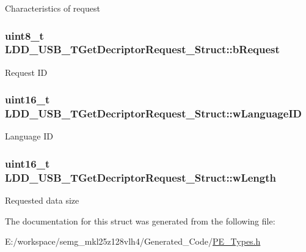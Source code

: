 Characteristics of request \hypertarget{struct_l_d_d___u_s_b___t_get_decriptor_request___struct_aa7651472aa5110086f335c0b79c0bc5b}{
\subsubsection[{b\-Request}]{\setlength{\rightskip}{0pt plus 5cm}uint8\-\_\-t L\-D\-D\-\_\-\-U\-S\-B\-\_\-\-T\-Get\-Decriptor\-Request\-\_\-\-Struct\-::b\-Request}}\label{struct_l_d_d___u_s_b___t_get_decriptor_request___struct_aa7651472aa5110086f335c0b79c0bc5b}
Request I\-D \hypertarget{struct_l_d_d___u_s_b___t_get_decriptor_request___struct_a228c41af26c45c1fa18d964c0702a4b4}{
\subsubsection[{w\-Language\-I\-D}]{\setlength{\rightskip}{0pt plus 5cm}uint16\-\_\-t L\-D\-D\-\_\-\-U\-S\-B\-\_\-\-T\-Get\-Decriptor\-Request\-\_\-\-Struct\-::w\-Language\-I\-D}}\label{struct_l_d_d___u_s_b___t_get_decriptor_request___struct_a228c41af26c45c1fa18d964c0702a4b4}
Language I\-D \hypertarget{struct_l_d_d___u_s_b___t_get_decriptor_request___struct_af9ac7409b4031aa6f3ec5da9d79b06eb}{
\subsubsection[{w\-Length}]{\setlength{\rightskip}{0pt plus 5cm}uint16\-\_\-t L\-D\-D\-\_\-\-U\-S\-B\-\_\-\-T\-Get\-Decriptor\-Request\-\_\-\-Struct\-::w\-Length}}\label{struct_l_d_d___u_s_b___t_get_decriptor_request___struct_af9ac7409b4031aa6f3ec5da9d79b06eb}
Requested data size 

The documentation for this struct was generated from the following file\-:\begin{DoxyCompactItemize}
\item 
E\-:/workspace/semg\-\_\-mkl25z128vlh4/\-Generated\-\_\-\-Code/\hyperlink{_p_e___types_8h}{P\-E\-\_\-\-Types.\-h}\end{DoxyCompactItemize}
